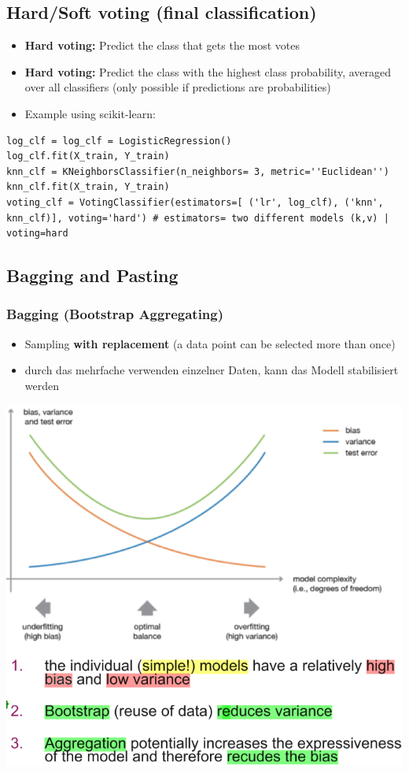 \subsection{Hard/Soft voting (final classification)}
\begin{itemize}
    \item \textbf{Hard voting:} Predict the class that gets the most votes
    \item \textbf{Hard voting:} Predict the class with the highest class probability, averaged over all classifiers (only possible if predictions are probabilities)
    \item Example using scikit-learn:
\end{itemize}
\begin{verbatim}
log_clf = log_clf = LogisticRegression()
log_clf.fit(X_train, Y_train)
knn_clf = KNeighborsClassifier(n_neighbors= 3, metric=''Euclidean'')
knn_clf.fit(X_train, Y_train)
voting_clf = VotingClassifier(estimators=[ ('lr', log_clf), ('knn', knn_clf)], voting='hard') # estimators= two different models (k,v) | voting=hard
\end{verbatim}

\subsection{Bagging and Pasting}

\subsubsection{Bagging (Bootstrap Aggregating)}
\begin{itemize}
    \item Sampling \textbf{with replacement} (a data point can be selected more than once)
    \item durch das mehrfache verwenden einzelner Daten, kann das Modell stabilisiert werden
\end{itemize}

\includegraphics[width=0.75\linewidth]{./img/w13_bagging.png}

